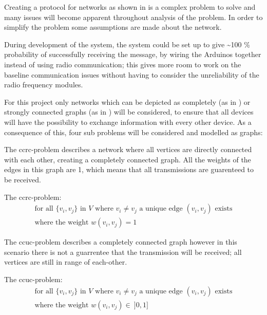 Creating a protocol for networks as shown in  is a complex problem to solve and many issues will become apparent throughout analysis of the problem.
In order to simplify the problem some assumptions are made about the network.

During development of the system, the system could be set up to give \textasciitilde100 \% probability of successfully receiving the message, by wiring the Arduinos together instead of using radio communication; this gives more room to work on the baseline communication issues without having to consider the unreliability of the radio frequency modules.

For this project only networks which can be depicted as completely (as in ) or strongly connected graphs (as in ) will be considered, to ensure that all devices will have the possibility to exchange information with every other device.
As a consequence of this, four sub problems will be considered and modelled as graphs:

\bigskip

\noindent The \gls{ccrc}-problem describes a network where all vertices are directly connected with each other, creating a completely connected graph.
All the weights of the edges in this graph are 1, which means that all transmissions are guarenteed to be received. 	

\begin{definition}
	The \acrshort{ccrc}-problem:
	\begin{align*}
		\text{for all } \{v_i, v_j\} \text{ in } V \text{ where } v_i \neq v_j \text{ a unique edge } (v_i, v_j) \text{ exists}\\
		\text{where the weight } w(v_i, v_j) = 1
	\end{align*}
\end{definition}

\noindent The \gls{ccuc}-problem describes a completely connected graph however in this scenario there is not a guarrentee that the transmission will be received; all vertices are still in range of each-other.

\begin{definition}
	The \acrshort{ccuc}-problem:
	\begin{align*}
		\text{for all } \{v_i, v_j\} \text{ in } V \text{ where } v_i \neq v_j \text{ a unique edge } (v_i, v_j) \text{ exists}\\
		\text{where the weight } w(v_i, v_j) \in\ ]0, 1]
	\end{align*}
\end{definition} 

